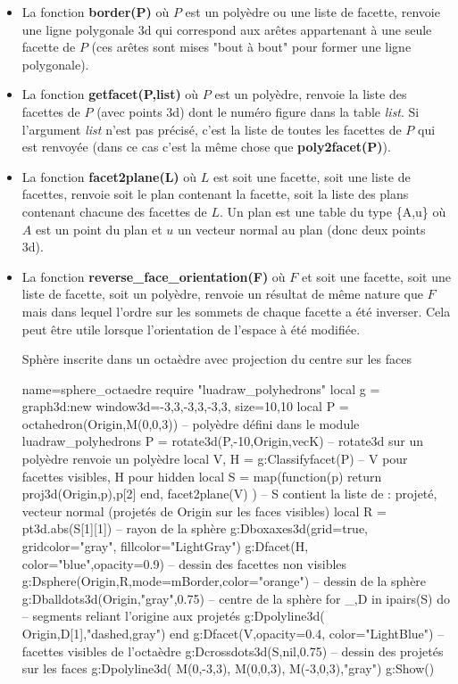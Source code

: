 \begin{itemize}
    \item La fonction \textbf{border(P)} où $P$ est un polyèdre ou une liste de facette, renvoie une ligne polygonale 3d qui correspond aux arêtes appartenant à une seule facette de $P$ (ces arêtes sont mises "bout à bout" pour former une ligne polygonale).
    
    \item La fonction \textbf{getfacet(P,list)} où $P$ est un polyèdre, renvoie la liste des facettes de $P$ (avec points 3d) dont le numéro figure dans la table \emph{list}. Si l'argument \emph{list} n'est pas précisé, c'est la liste de toutes les facettes de $P$ qui est renvoyée (dans ce cas c'est la même chose que \textbf{poly2facet(P)}).
    
    \item La fonction \textbf{facet2plane(L)} où $L$ est soit une facette, soit une liste de facettes, renvoie soit le plan contenant la facette, soit la liste des plans contenant chacune des facettes de $L$. Un plan est une table du type \{A,u\} où $A$ est un point du plan et $u$ un vecteur normal au plan (donc deux points 3d).
    
    \item La fonction \textbf{reverse\_face\_orientation(F)} où $F$ et soit une facette, soit une liste de facette, soit un polyèdre, renvoie un résultat de même nature que $F$ mais dans lequel l'ordre sur les sommets de chaque facette a été inverser. Cela peut être utile lorsque l'orientation de l'espace à été modifiée.
    
\begin{demo}{Sphère inscrite dans un octaèdre avec projection du centre sur les faces}
\begin{luadraw}{name=sphere_octaedre}
require "luadraw_polyhedrons"
local g = graph3d:new{ window3d={-3,3,-3,3,-3,3}, size={10,10}}
local P = octahedron(Origin,M(0,0,3)) -- polyèdre défini dans le module luadraw_polyhedrons
P = rotate3d(P,-10,{Origin,vecK}) -- rotate3d sur un polyèdre renvoie un polyèdre
local V, H = g:Classifyfacet(P) -- V pour facettes visibles, H pour hidden
local S = map(function(p) return {proj3d(Origin,p),p[2]} end, facet2plane(V) )
-- S contient la liste de : {projeté, vecteur normal} (projetés de Origin sur les faces visibles)
local R = pt3d.abs(S[1][1]) -- rayon de la sphère
g:Dboxaxes3d({grid=true, gridcolor="gray", fillcolor="LightGray"})
g:Dfacet(H, {color="blue",opacity=0.9}) -- dessin des facettes non visibles
g:Dsphere(Origin,R,{mode=mBorder,color="orange"}) -- dessin de la sphère
g:Dballdots3d(Origin,"gray",0.75) -- centre de la sphère
for _,D in ipairs(S) do -- segments reliant l'origine aux projetés
    g:Dpolyline3d( {Origin,D[1]},"dashed,gray")
end
g:Dfacet(V,{opacity=0.4, color="LightBlue"}) -- facettes visibles de l'octaèdre
g:Dcrossdots3d(S,nil,0.75) -- dessin des projetés sur les faces
g:Dpolyline3d( {M(0,-3,3), M(0,0,3), M(-3,0,3)},"gray")
g:Show()            
\end{luadraw}
\end{demo}
\end{itemize}

